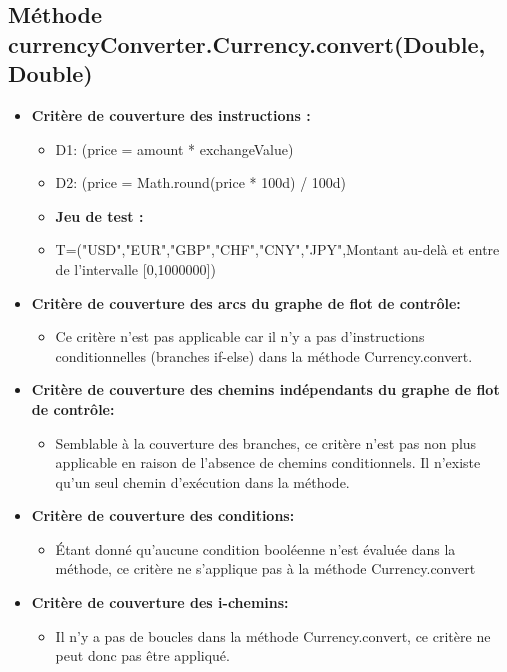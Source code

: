 \documentclass[letterpaper, 10pt]{article}
\begin{document}
\subsection*{Méthode currencyConverter.Currency.convert(Double, Double)}
\begin{itemize}
   \item \textbf{Critère de couverture des instructions :}
        \begin{itemize}
          \item D1: {(price = amount * exchangeValue)}
         \item D2: {(price = Math.round(price * 100d) / 100d)}
        
    \item \textbf{Jeu de test :}
      
            \item T={("USD","EUR","GBP","CHF","CNY","JPY",Montant au-delà et entre de l'intervalle [0,1000000])}\\
        \end{itemize}
   
    \item \textbf{Critère de couverture des arcs du graphe de flot de contrôle:}
        \begin{itemize}
            \item Ce critère n'est pas applicable car il n'y a pas d'instructions conditionnelles (branches if-else) dans la méthode Currency.convert.
        \end{itemize}    
        
    \item \textbf{Critère de couverture des chemins indépendants du graphe de flot de contrôle:}
    \begin{itemize}
        \item Semblable à la couverture des branches, ce critère n’est pas non plus applicable en raison de l’absence de chemins conditionnels. Il n’existe qu’un seul chemin d’exécution dans la méthode.
    \end{itemize}
    
    \item \textbf{Critère de couverture des conditions:}
    \begin{itemize}
        \item Étant donné qu'aucune condition booléenne n'est évaluée dans la méthode, ce critère ne s'applique pas à la méthode Currency.convert
    \end{itemize}
    
    \item \textbf{Critère de couverture des i-chemins:}
    \begin{itemize}
        \item Il n'y a pas de boucles dans la méthode Currency.convert, ce critère ne peut donc pas être appliqué.
    \end{itemize}
    
\end{itemize}
\end{document}
